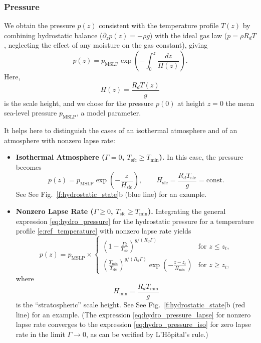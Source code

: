 \documentclass{report}
\begin{document}
{\subsubsection{Pressure}

We obtain the pressure $p(z)$ consistent with the temperature profile $T(z)$ by combining hydrostatic balance ($\partial_z p(z) = - \rho g$) with the ideal gas law ($p=\rho R_d T$, neglecting the effect of any moisture on the gas constant), giving
\begin{equation}\label{eq:hydro_pressure}
p(z) = p_{\mathrm{MSLP}} \exp\left(-\int_0^z \frac{dz}{H(z)} \right).
\end{equation}
Here,
\begin{equation}
H(z)  = \frac{R_d T(z)}{g}
\end{equation}
is the scale height, and we chose for the pressure $p(0)$ at height $z=0$ the mean sea-level pressure $p_{\mathrm{MSLP}}$, a model parameter. 

It helps here to distinguish the cases of an isothermal atmosphere and of an atmosphere with nonzero lapse rate:
\begin{itemize}
\item \textbf{Isothermal Atmosphere ($\Gamma = 0$, $T_{\mathrm{sfc}} \ge T_{\min}$).} 
In this case, the pressure becomes 
\begin{equation}\label{eq:hydro_pressure_iso}
    p(z) = p_{\mathrm{MSLP}} \exp \left(-\frac{z}{H_{\mathrm{sfc}}} \right), \qquad H_{\mathrm{sfc}} = \frac{R_d T_{\mathrm{sfc}}}{g} = \mathrm{const}.
\end{equation}
See See Fig.~\ref{f:hydrostatic_state}b (blue line) for an example.

\item \textbf{Nonzero Lapse Rate ($\Gamma \ge 0$, $T_{\mathrm{sfc}} \ge T_{\min}$).}
Integrating the general expression \eqref{eq:hydro_pressure} for the hydrostatic pressure for a temperature profile \eqref{e:ref_temperature} with nonzero lapse rate yields
\begin{equation}\label{eq:hydro_pressure_lapse}
p(z) = p_{\mathrm{MSLP}} \times
\begin{cases}
\left(1 - \frac{\Gamma z}{T_{\mathrm{sfc}}} \right)^{g/(R_d \Gamma)} & \text{for } z \le z_t, \\[1.5ex]
  \left(\frac{T_{\min}}{T_{\mathrm{sfc}}} \right)^{g/(R_d \Gamma)}
 \exp  \left(-\frac{z - z_t}{H_{\min}} \right) & \text{for } z\ge z_t, 
\end{cases}
\end{equation}
where 
\begin{equation}
H_{\min} = \frac{R_d T_{\min}}{g}
\end{equation}
is the ``stratospheric'' scale height. See See Fig.~\ref{f:hydrostatic_state}b (red line) for an example. (The expression \eqref{eq:hydro_pressure_lapse} for nonzero lapse rate converges to the expression \eqref{eq:hydro_pressure_iso} for zero lapse rate in the limit $\Gamma \to 0$, as can be verified by L'H{\^o}pital's rule.)
\end{itemize}

}
\end{document}
